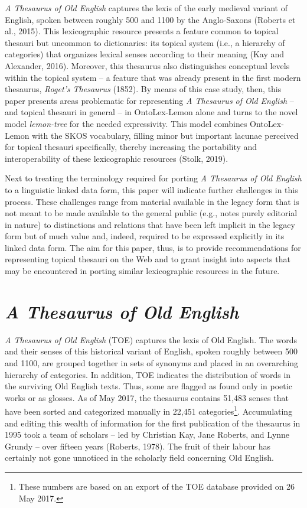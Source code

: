 \textit{A Thesaurus of Old English} captures the lexis of the early medieval variant of English, spoken between roughly 500 and 1100 by the Anglo-Saxons (Roberts et al., 2015). This lexicographic resource presents a feature common to topical thesauri but uncommon to dictionaries: its topical system (i.e., a hierarchy of categories) that organizes lexical senses according to their meaning (Kay and Alexander, 2016). Moreover, this thesaurus also distinguishes conceptual levels within the topical system – a feature that was already present in the first modern thesaurus, \textit{Roget’s Thesaurus} (1852). By means of this case study, then, this paper presents areas problematic for representing \textit{A Thesaurus of Old English} – and topical thesauri in general – in OntoLex-Lemon alone and turns to the novel model \textit{lemon-tree} for the needed expressivity. This model combines OntoLex-Lemon with the SKOS vocabulary, filling minor but important lacunae perceived for topical thesauri specifically, thereby increasing the portability and interoperability of these lexicographic resources (Stolk, 2019).

Next to treating the terminology required for porting \textit{A Thesaurus of Old English} to a linguistic linked data form, this paper will indicate further challenges in this process. These challenges range from material available in the legacy form that is not meant to be made available to the general public (e.g., notes purely editorial in nature) to distinctions and relations that have been left implicit in the legacy form but of much value and, indeed, required to be expressed explicitly in its linked data form. The aim for this paper, thus, is to provide recommendations for representing topical thesauri on the Web and to grant insight into aspects that may be encountered in porting similar lexicographic resources in the future.

\section{\textit{A Thesaurus of Old English}}
\textit{A Thesaurus of Old English} (TOE) captures the lexis of Old English. The words and their senses of this historical variant of English, spoken roughly between 500 and 1100, are grouped together in sets of synonyms and placed in an overarching hierarchy of categories. In addition, TOE indicates the distribution of words in the surviving Old English texts. Thus, some are flagged as found only in poetic works or as glosses. As of May 2017, the thesaurus contains 51,483 senses that have been sorted and categorized manually in 22,451 categories\footnote{These numbers are based on an export of the TOE database provided on 26 May 2017.}. Accumulating and editing this wealth of information for the first publication of the thesaurus in 1995 took a team of scholars – led by Christian Kay, Jane Roberts, and Lynne Grundy – over fifteen years (Roberts, 1978). The fruit of their labour has certainly not gone unnoticed in the scholarly field concerning Old English.

